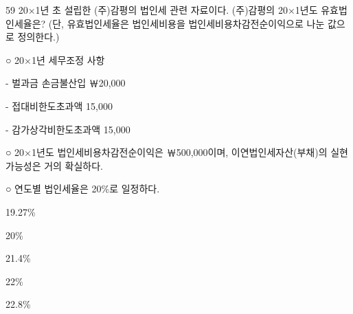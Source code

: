 \begin{question}{59}
20×1년 초 설립한 (주)감평의 법인세 관련 자료이다. (주)감평의 20×1년도 유효법인세율은? (단, 유효법인세율은 법인세비용을 법인세비용차감전순이익으로 나눈 값으로 정의한다.)
\begin{framedtext}
○ 20×1년 세무조정 사항 \par
\hspace*{0.5em}- 벌과금 손금불산입 \hfill ￦20,000\hspace*{12em} \par
\hspace*{0.5em}- 접대비한도초과액 \hfill 15,000\hspace*{12em} \par
\hspace*{0.5em}- 감가상각비한도초과액 \hfill 15,000\hspace*{12em} \par
○ 20×1년도 법인세비용차감전순이익은 ￦500,000이며, 이연법인세자산(부채)의 실현가능성은 거의 확실하다. \par
○ 연도별 법인세율은 20\%로 일정하다. \par
\end{framedtext}
\begin{choices}
  \item 19.27\%
  \item 20\%
  \item 21.4\%
  \item 22\%
  \item 22.8\%
\end{choices}
\end{question}
